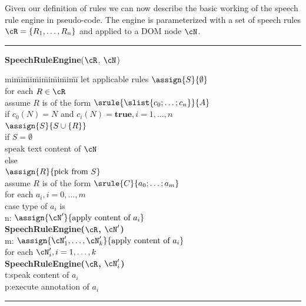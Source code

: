 \documentclass{sig-alternate}
\begin{document}
Given our definition of rules we can now describe the basic working of the
speech rule engine in pseudo-code. The engine is parameterized with a set of
speech rules ${\cR}={\{R_1,\ldots,R_n\}}$ and applied to a DOM node $\cN$.

\vspace{.3cm}\hrule\vspace{.2cm}
\noindent \textbf{SpeechRuleEngine}($\cR$, $\cN$)
\vspace{-.2cm}\begin{ntabbing}
  mi\=mi\=mi\=mi\=mi\=mi\=mi\=mi\=\kill
  let applicable rules $\assign{S}{\emptyset}$\label{}\\
  for each $R\in \cR$\label{}\\
  \> assume $R$ is of the form $\srule{\slist{c_0;\ldots;c_n}}{A}$\label{}\\
  \> if $c_0(N) = N$ and $c_i(N) = \mathbf{true}, i=1,\ldots,n$\label{}\\
  \>\> $\assign{S}{S\cup\{R\}}$\label{}\\
  if $S=\emptyset$\label{}\\
  \> speak text content of $\cN$\label{line:default}\\
  else \label{}\\
  \> $\assign{R}{\mbox{pick from }S}$ \label{line:heuristic}\\
  \> assume $R$ is of the form $\srule{C}{a_0;\ldots;a_m}$\label{}\\
  \> for each $a_i, i=0,\ldots,m$\label{}\\
  \>\>case type of $a_i$ is\label{}\\
  \>\>\>n:\> $\assign{\cN'}{\mbox{apply content of } a_i}$\label{line:case-n}\\
  \>\>\>\>\textbf{SpeechRuleEngine($\cR$, $\cN'$)}\label{}\\
  \>\>\>m:\> $\assign{\cN_1',\ldots,\cN_k'}{\mbox{apply content of } a_i}$\label{line:case-m}\\
  \>\>\>\>for each $\cN_i', i=1,\ldots,k$\label{}\\
  \>\>\>\>\>\textbf{SpeechRuleEngine($\cR$, $\cN_i'$)}\label{}\\
  \>\>\>t:\>speak content of $a_i$\label{line:case-t}\\
  \>\>\>p:\>execute annotation of $a_i$\label{line:case-p}\\
\end{ntabbing}
\vspace{-.5cm}\hrule\vspace{.2cm} 
\end{document}

